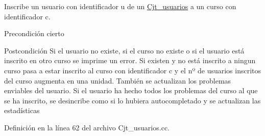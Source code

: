 Inscribe un usuario con identificador u de un \mbox{\hyperlink{class_cjt__usuarios}{Cjt\+\_\+usuarios}} a un curso con identificador c. 

\begin{DoxyPrecond}{Precondición}
cierto 
\end{DoxyPrecond}
\begin{DoxyPostcond}{Postcondición}
Si el usuario no existe, si el curso no existe o si el usuario está inscrito en otro curso se imprime un error. Si existen y no está inscrito a ningun curso pasa a estar inscrito al curso con identificador c y el nº de usuarios inscritos del curso augmenta en una unidad. También se actualizan los problemas enviables del usuario. Si el usuario ha hecho todos los problemas del curso al que se ha inscrito, se desincribe como si lo hubiera autocompletado y se actualizan las estadísticas 
\end{DoxyPostcond}


Definición en la línea 62 del archivo Cjt\+\_\+usuarios.\+cc.


